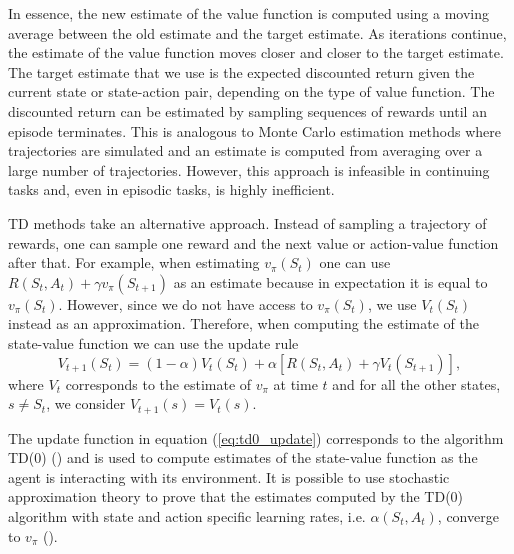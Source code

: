 
In essence, the new estimate of the value function is computed using a moving average between the old estimate and the target estimate.
As iterations continue, the estimate of the value function moves closer and closer to the target estimate.
The target estimate that we use is the expected discounted return given the current state or state-action pair, depending on the type of value function.
The discounted return can be estimated by sampling sequences of rewards until an episode terminates.
This is analogous to Monte Carlo estimation methods where trajectories are simulated and an estimate is computed from averaging over a large number of trajectories.
However, this approach is infeasible in continuing tasks and, even in episodic tasks, is highly inefficient. 

TD methods take an alternative approach. 
Instead of sampling a trajectory of rewards, one can sample one reward and the next value or action-value function after that. 
For example, when estimating $v_\pi(S_t)$ one can use $R(S_t, A_t) + \gamma v_\pi(S_{t+1})$ as an estimate because in expectation it is equal to $v_\pi(S_t)$.
However, since we do not have access to $v_\pi(S_t)$, we use $V_t(S_t)$ instead as an approximation.
Therefore, when computing the estimate of the state-value function we can use the update rule 
\begin{equation}
\label{eq:td0_update}
V_{t+1} (S_t) = (1-\alpha) V_t(S_t) + \alpha [R(S_t, A_t) + \gamma V_t(S_{t+1})],
\end{equation}
where $V_{t}$ corresponds to the estimate of $v_\pi$ at time $t$ and for all the other states, $s \neq S_t$, we consider $V_{t+1}(s) = V_{t}(s)$.

The update function in equation (\ref{eq:td0_update}) corresponds to the algorithm TD(0) (\cite{sutton1988learning}) and is used to compute estimates of the state-value function as the agent is interacting with its environment.
It is possible to use stochastic approximation theory to prove that the estimates computed by the TD(0) algorithm with state and action specific learning rates, i.e. $\alpha(S_t,A_t)$, converge to $v_\pi$ (\cite{Bertsekas:1996:NP:560669}). 

